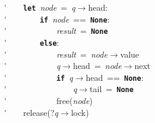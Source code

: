 \'\>~~~~\texttt{\textbf{let}}~\textit{node}~=~\textit{q}$\rightarrow$head:\\

\'\>~~~~~~~~\texttt{\textbf{if}}~\textit{node}~==~\texttt{\textbf{None}}:\\

\'\>~~~~~~~~~~~~\textit{result}~=~\texttt{\textbf{None}}\\

\'\>~~~~~~~~\texttt{\textbf{else}}:\\

\'\>~~~~~~~~~~~~\textit{result}~=~\textit{node}$\rightarrow$value\\

\'\>~~~~~~~~~~~~\textit{q}$\rightarrow$head~=~\textit{node}$\rightarrow$next\\

\'\>~~~~~~~~~~~~\texttt{\textbf{if}}~\textit{q}$\rightarrow$head~==~\texttt{\textbf{None}}:\\

\'\>~~~~~~~~~~~~~~~~\textit{q}$\rightarrow$tail~=~\texttt{\textbf{None}}\\

\'\>~~~~~~~~~~~~free(\textit{node})\\

\'\>~~~~release(?\textit{q}$\rightarrow$lock)
